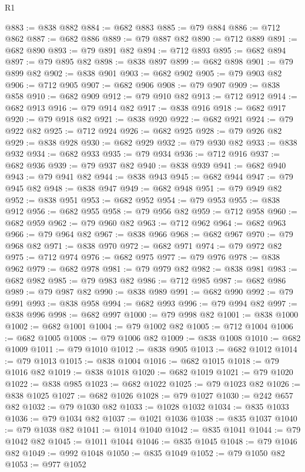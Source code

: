 \begin{lexlean}{R1}
\begin{coremodule}
{{{{{{{{{{{{{{{{{{{{{{{{{{{{{{{{{{{{{{{{{{{{{{{{{{@883 := @838 @882
@884 := @682 @883
@885 := @79 @884
@886 := @712 @862
@887 := @682 @886
@889 := @79 @887 @82
@890 := @712 @889
@891 := @682 @890
@893 := @79 @891 @82
@894 := @712 @893
@895 := @682 @894
@897 := @79 @895 @82
@898 := @838 @897
@899 := @682 @898
@901 := @79 @899 @82
@902 := @838 @901
@903 := @682 @902
@905 := @79 @903 @82
@906 := @712 @905
@907 := @682 @906
@908 := @79 @907
@909 := @838 @858
@910 := @682 @909
@912 := @79 @910 @82
@913 := @712 @912
@914 := @682 @913
@916 := @79 @914 @82
@917 := @838 @916
@918 := @682 @917
@920 := @79 @918 @82
@921 := @838 @920
@922 := @682 @921
@924 := @79 @922 @82
@925 := @712 @924
@926 := @682 @925
@928 := @79 @926 @82
@929 := @838 @928
@930 := @682 @929
@932 := @79 @930 @82
@933 := @838 @932
@934 := @682 @933
@935 := @79 @934
@936 := @712 @916
@937 := @682 @936
@939 := @79 @937 @82
@940 := @838 @939
@941 := @682 @940
@943 := @79 @941 @82
@944 := @838 @943
@945 := @682 @944
@947 := @79 @945 @82
@948 := @838 @947
@949 := @682 @948
@951 := @79 @949 @82
@952 := @838 @951
@953 := @682 @952
@954 := @79 @953
@955 := @838 @912
@956 := @682 @955
@958 := @79 @956 @82
@959 := @712 @958
@960 := @682 @959
@962 := @79 @960 @82
@963 := @712 @962
@964 := @682 @963
@966 := @79 @964 @82
@967 := @838 @966
@968 := @682 @967
@970 := @79 @968 @82
@971 := @838 @970
@972 := @682 @971
@974 := @79 @972 @82
@975 := @712 @974
@976 := @682 @975
@977 := @79 @976
@978 := @838 @962
@979 := @682 @978
@981 := @79 @979 @82
@982 := @838 @981
@983 := @682 @982
@985 := @79 @983 @82
@986 := @712 @985
@987 := @682 @986
@989 := @79 @987 @82
@990 := @838 @989
@991 := @682 @990
@992 := @79 @991
@993 := @838 @958
@994 := @682 @993
@996 := @79 @994 @82
@997 := @838 @996
@998 := @682 @997
@1000 := @79 @998 @82
@1001 := @838 @1000
@1002 := @682 @1001
@1004 := @79 @1002 @82
@1005 := @712 @1004
@1006 := @682 @1005
@1008 := @79 @1006 @82
@1009 := @838 @1008
@1010 := @682 @1009
@1011 := @79 @1010
@1012 := @838 @905
@1013 := @682 @1012
@1014 := @79 @1013
@1015 := @838 @1004
@1016 := @682 @1015
@1018 := @79 @1016 @82
@1019 := @838 @1018
@1020 := @682 @1019
@1021 := @79 @1020
@1022 := @838 @985
@1023 := @682 @1022
@1025 := @79 @1023 @82
@1026 := @838 @1025
@1027 := @682 @1026
@1028 := @79 @1027
@1030 := @242 @657 @82
@1032 := @79 @1030 @82
@1033 := @1028 @1032
@1034 := @835 @1033
@1036 := @79 @1034 @82
@1037 := @1021 @1036
@1038 := @835 @1037
@1040 := @79 @1038 @82
@1041 := @1014 @1040
@1042 := @835 @1041
@1044 := @79 @1042 @82
@1045 := @1011 @1044
@1046 := @835 @1045
@1048 := @79 @1046 @82
@1049 := @992 @1048
@1050 := @835 @1049
@1052 := @79 @1050 @82
@1053 := @977 @1052
}}}}}}}}}}}}}}}}}}}}}}}}}}}}}}}}}}}}}}}}}}}}}}}}}}
\end{coremodule}
\end{lexlean}
